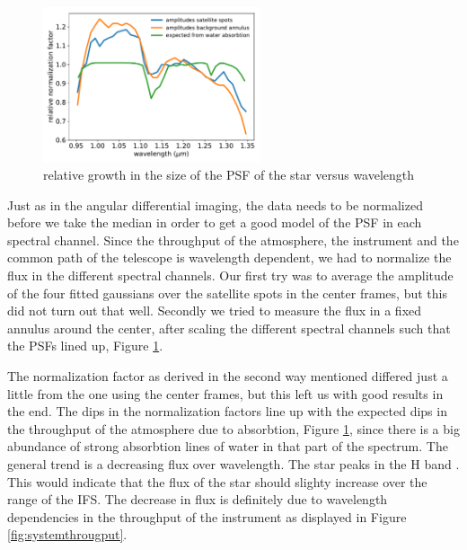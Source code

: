\documentclass[twoside,single]{lion-msc}
\begin{document}
\begin{figure}
\centering
\includegraphics[width = 0.57\textwidth]{allnormalization}
\caption{relative growth in the size of the PSF of the star versus wavelength}
\label{fig:throughputnorm}
\end{figure}

\noindent
Just as in the angular differential imaging, the data needs to be normalized before we take the median in order to get a good model of the PSF in each spectral channel. Since the throughput of the atmosphere, the instrument and the common path of the telescope is wavelength dependent, we had to normalize the flux in the different spectral channels. Our first try was to average the amplitude of the four fitted gaussians over the satellite spots in the center frames, but this did not turn out that well. Secondly we tried to measure the flux in a fixed annulus around the center, after scaling the different spectral channels such that the PSFs lined up, Figure \ref{fig:throughputnorm}.
\bigskip

The normalization factor as derived in the second way mentioned differed just a little from the one using the center frames, but this left us with good results in the end. The dips in the normalization factors line up with the expected dips in the throughput of the atmosphere due to absorbtion, Figure \ref{fig:throughputnorm}, since there is a big abundance of strong absorbtion lines of water in that part of the spectrum. The general trend is a decreasing flux over wavelength. The star peaks in the H band \citep{Padgett}. This would indicate that the flux of the star should slighty increase over the range of the IFS. The decrease in flux is definitely due to wavelength dependencies in the throughput of the instrument as displayed in Figure \ref{fig:systemthrougput}. 



\end{document}
